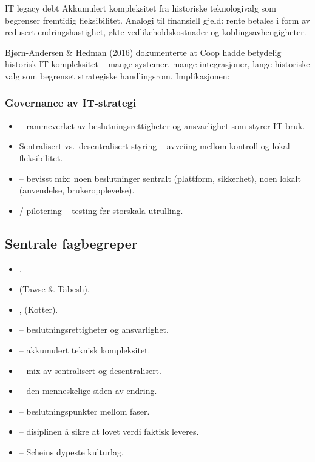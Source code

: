 \begin{definition}{IT legacy debt}
Akkumulert kompleksitet fra historiske teknologivalg som begrenser fremtidig
fleksibilitet. Analogi til finansiell gjeld: rente betales i form av redusert
endringshastighet, økte vedlikeholdskostnader og koblingsavhengigheter.
\end{definition}

Bjørn-Andersen \& Hedman (2016) dokumenterte at Coop hadde betydelig
historisk IT-kompleksitet -- mange systemer, mange integrasjoner, lange
historiske valg som begrenset strategiske handlingsrom. Implikasjonen:

\subsubsection*{Governance av IT-strategi}
\begin{itemize}
  \item {} -- rammeverket av beslutningsrettigheter og
    ansvarlighet som styrer IT-bruk.
  \item Sentralisert vs.\ desentralisert styring -- avveiing mellom kontroll
    og lokal fleksibilitet.
  \item {} -- bevisst mix: noen beslutninger sentralt
    (plattform, sikkerhet), noen lokalt (anvendelse, brukeropplevelse).
  \item {} / pilotering -- testing før storskala-utrulling.
\end{itemize}

\subsection{Sentrale fagbegreper}\label{terms:lec07}
\begin{itemize}
  \item {}.
  \item {}
    (Tawse \& Tabesh).
  \item {},  (Kotter).
  \item {} -- beslutningsrettigheter og ansvarlighet.
  \item {} -- akkumulert teknisk kompleksitet.
  \item {} -- mix av sentralisert og desentralisert.
  \item {} -- den menneskelige siden av endring.
  \item {} -- beslutningspunkter mellom faser.
  \item {} -- disiplinen å sikre at lovet verdi
    faktisk leveres.
  \item {} -- Scheins dypeste kulturlag.
\end{itemize}

